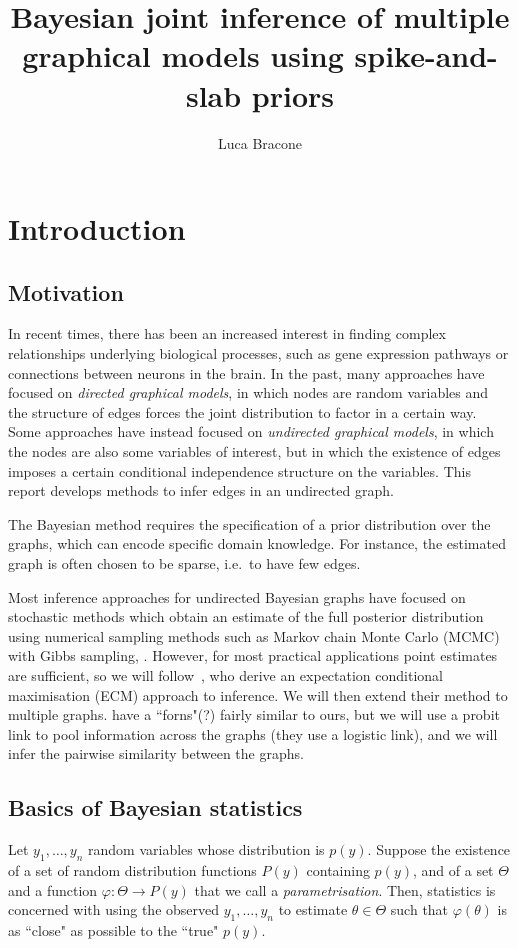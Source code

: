 \documentclass[a4paper, 11pt, oneside]{report}
\author{Luca Bracone}
\title{Bayesian joint inference of multiple graphical models using
spike-and-slab priors}
\newcommand{\1}{\mathds{1}}
\begin{document}
\maketitle

\chapter{Introduction}
\section{Motivation}
In recent times, there has been an increased interest in finding complex
relationships underlying biological processes, such as gene expression pathways
or connections between neurons in the brain. In the past, many approaches have
focused on \emph{directed graphical models}, in which nodes are random
variables and the structure of edges forces the joint distribution to factor in
a certain way. Some approaches have instead focused on \emph{undirected
	graphical models}, in which the nodes are also some variables of interest, but
in which the existence of edges imposes a certain conditional independence
structure on the variables. This report develops methods to infer edges in an
undirected graph.

The Bayesian method requires the specification of a prior distribution over the
graphs, which can encode specific domain knowledge. For instance, the estimated
graph is often chosen to be sparse,
i.e.\ to have few edges.

Most inference approaches for undirected Bayesian graphs have focused on
stochastic methods which obtain an estimate of the full posterior distribution
using numerical sampling methods such as Markov chain Monte Carlo (MCMC) with
Gibbs sampling, \parencite{wang-2015}. However, for most practical applications
point estimates are sufficient, so we will follow~\cite{limcco-2017}, who
derive an expectation conditional maximisation (ECM) approach to inference. We
will then extend their method to multiple graphs. \cite{luke2017} have a
``forns"(?) fairly similar to ours, but we will use a probit link to pool
information across the graphs (they use a logistic link), and we will infer the
pairwise similarity between the graphs.

\section{Basics of Bayesian statistics}
Let $y_1, \dots, y_n$ random variables whose distribution is $p(y)$. Suppose
the existence of a set of random distribution functions $P(y)$ containing
$p(y)$, and of a set $\Theta$ and a function $\varphi: \Theta \to P(y)$ that we
call a \emph{parametrisation}. Then, statistics is concerned with using the
observed $y_1,\dots,y_n$ to estimate $\theta \in \Theta$ such that
$\varphi(\theta)$ is as ``close" as possible to the ``true" $p(y)$.
\end{document}

